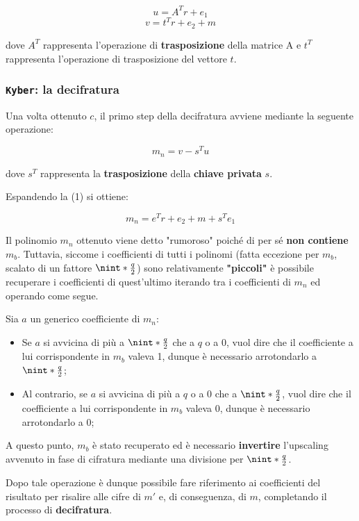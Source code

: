 \documentclass[a4paper, 12pt, oneside]{article}
\DeclarePairedDelimiter{\nint}\lfloor\rceil %
\theoremstyle{definition}
\begin{document}
\[ u = A^Tr + e_1 \] \[v = t^Tr + e_2 + m \]

dove $A^T$ rappresenta l'operazione di \textbf{trasposizione} della matrice A e $t^T$ rappresenta l'operazione di trasposizione del vettore $t$.

\subsubsection{\texttt{Kyber}: la decifratura}
Una volta ottenuto $c$, il primo step della decifratura avviene mediante la seguente operazione:

\begin{equation}
    m_n = v - s^Tu
\end{equation}

dove $s^T$ rappresenta la \textbf{trasposizione} della \textbf{chiave privata} $s$. 

Espandendo la (1) si ottiene:

\begin{equation}
    m_n = e^Tr + e_2 + m + s^Te_1
\end{equation}

Il polinomio $m_n$ ottenuto viene detto "rumoroso" poiché di per sé \textbf{non contiene $m_b$}.
Tuttavia, siccome i coefficienti di tutti i polinomi (fatta eccezione per $m_b$, scalato di un fattore $\nint*{\frac{q}{2}}$) sono relativamente \textbf{"piccoli"} è possibile recuperare i coefficienti di quest'ultimo iterando tra i coefficienti di $m_n$ ed operando come segue. 

Sia $a$ un generico coefficiente di $m_n$:

\begin{itemize}
    \item Se $a$ si avvicina di più a $\nint*{\frac{q}{2}}$ che a $q$ o a 0, vuol dire che il coefficiente a lui corrispondente in $m_b$ valeva 1, dunque è necessario arrotondarlo a $\nint*{\frac{q}{2}}$;
    \item Al contrario, se $a$ si avvicina di più a $q$ o a 0 che a $\nint*{\frac{q}{2}}$, vuol dire che il coefficiente a lui corrispondente in $m_b$ valeva 0, dunque è necessario arrotondarlo a $0$;
\end{itemize}

A questo punto, $m_b$ è stato recuperato ed è necessario \textbf{invertire} l'upscaling avvenuto in fase di cifratura mediante una divisione per $\nint*{\frac{q}{2}}$.

Dopo tale operazione è dunque possibile fare riferimento ai coefficienti del risultato per risalire alle cifre di $m'$ e, di conseguenza, di $m$, completando il processo di \textbf{decifratura}.

\newpage
\printbibliography[title={Riferimenti bibliografici e risorse consultate}]
\end{document}
